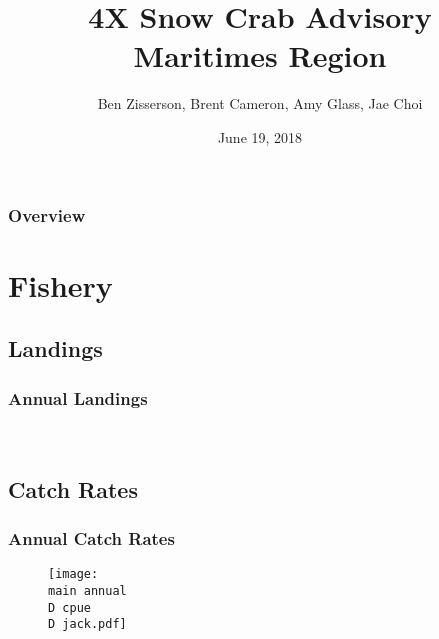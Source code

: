 \documentclass{beamer}
\date{June 19, 2018}
\title[4X Snow Crab Advisory \present]{4X Snow Crab Advisory\\  Maritimes Region\\ \present }
\author[Snow Crab Unit]{Ben Zisserson, Brent Cameron, Amy Glass, Jae Choi}
\institute[DFO Science]{
	Canadian Department of Fisheries and Oceans \\ %
	Science Branch \\
	Population Ecology Division
	\medskip
	\textit{} %
}
\numberwithin{equation}{section}		%
\numberwithin{figure}{section}	   	%
\numberwithin{table}{section}				%
\newcommand{\D}{.}  %
\newcommand{\main}{C:/bio.data/bio.snowcrab/assessments/2018/presentations/4X/}
\begin{document}
	
\begin{frame}
\titlepage %

\end{frame}


\begin{frame}
\frametitle{Overview} %
\tableofcontents %
\end{frame}



\section{Fishery}

\subsection{Landings}
\begin{frame}
\frametitle{Annual Landings}
\begin{figure}
 \vspace*{-0.4cm}
\centering
 \
\end{figure}
\end{frame}

%

%
\begin{frame}
\subsection{Catch Rates}
\frametitle{Annual Catch Rates}
\begin{figure}
 \centerline{\texttt{[image: \\main annual\\D cpue\\D jack.pdf]}}

 \end{figure}
\end{frame}
\end{document}
